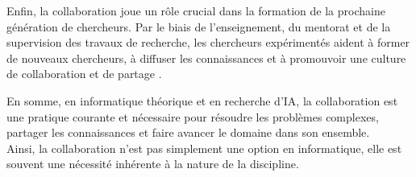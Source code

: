Enfin, la collaboration joue un rôle crucial dans la formation de la prochaine génération de chercheurs. Par le biais de l'enseignement, du mentorat et de la supervision des travaux de recherche, les chercheurs expérimentés aident à former de nouveaux chercheurs, à diffuser les connaissances et à promouvoir une culture de collaboration et de partage \cite{long_cooperation_2008}.

En somme, en informatique théorique et en recherche d'IA, la collaboration est une pratique courante et nécessaire pour résoudre les problèmes complexes, partager les connaissances et faire avancer le domaine dans son ensemble.\\


Ainsi, la collaboration n'est pas simplement une option en informatique, elle est souvent une nécessité inhérente à la nature de la discipline.

